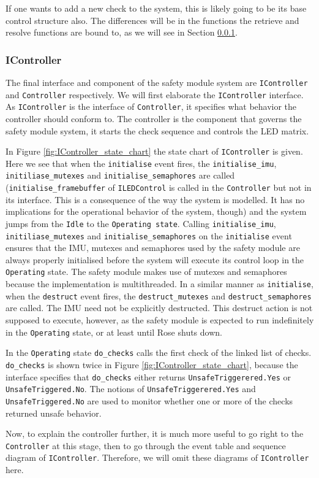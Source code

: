\documentclass[12pt]{scrreprt}
\begin{document}
If one wants to add a new check to the system, this is likely going to be its base control structure also. The differences will be in the functions the retrieve and resolve functions are bound to, as we will see in Section \ref{}.

\subsubsection{IController}
The final interface and component of the safety module system are \texttt{IController} and \texttt{Controller} respectively. We will first elaborate the \texttt{IController} interface. As \texttt{IController} is the interface of \texttt{Controller}, it specifies what behavior the controller should conform to. The controller is the component that governs the safety module system, it starts the check sequence and controls the LED matrix.
\par
In Figure \ref{fig:IController_state_chart} the state chart of \texttt{IController} is given. Here we see that when the \texttt{initialise} event fires, the \texttt{initialise\_imu}, \texttt{initiliase\_mutexes} and \texttt{initialise\_semaphores} are called (\texttt{initialise\_framebuffer} of \texttt{ILEDControl} is called in the \texttt{Controller} but not in its interface. This is a consequence of the way the system is modelled. It has no implications for the operational behavior of the system, though) and the system jumps from the \texttt{Idle} to the \texttt{Operating state}. Calling \texttt{initialise\_imu}, \texttt{initiliase\_mutexes} and \texttt{initialise\_semaphores} on the \texttt{initialise} event ensures that the IMU, mutexes and semaphores used by the safety module are always properly initialised before the system will execute its control loop in the \texttt{Operating} state. The safety module makes use of mutexes and semaphores because the implementation is multithreaded. In a similar manner as \texttt{initialise}, when the \texttt{destruct} event fires, the \texttt{destruct\_mutexes} and \texttt{destruct\_semaphores} are called. The IMU need not be explicitly destructed. This destruct action is not supposed to execute, however, as the safety module is expected to run indefinitely in the \texttt{Operating} state, or at least until Rose shuts down.
\par
In the \texttt{Operating} state \texttt{do\_checks} calls the first check of the linked list of checks. \texttt{do\_checks} is shown twice in Figure \ref{fig:IController_state_chart}, because the interface specifies that \texttt{do\_checks} either returns \texttt{UnsafeTriggerered.Yes} or \texttt{UnsafeTriggered.No}. The notions of \texttt{UnsafeTriggerered.Yes} and \texttt{UnsafeTriggered.No} are used to monitor whether one or more of the checks returned unsafe behavior.
\par
Now, to explain the controller further, it is much more useful to go right to the \texttt{Controller} at this stage, then to go through the event table and sequence diagram of \texttt{IController}. Therefore, we will omit these diagrams of \texttt{IController} here.
\end{document}
